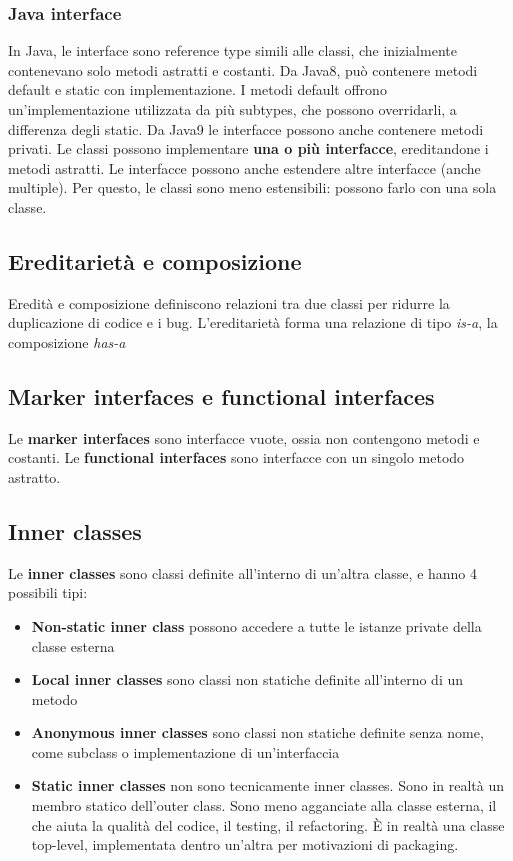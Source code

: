 \documentclass[11pt]{article}
\begin{document}
\subsubsection{Java interface}
In Java, le interface sono reference type simili alle classi, che inizialmente contenevano solo metodi astratti e costanti. Da Java8, può contenere metodi default e static con implementazione. I metodi default offrono un'implementazione utilizzata da più subtypes, che possono overridarli, a differenza degli static. Da Java9 le interfacce possono anche contenere metodi privati. Le classi possono implementare \textbf{una o più interfacce}, ereditandone i metodi astratti. Le interfacce possono anche estendere altre interfacce (anche multiple). Per questo, le classi sono meno estensibili: possono farlo con una sola classe.
\subsection{Ereditarietà e composizione}
Eredità e composizione definiscono relazioni tra due classi per ridurre la duplicazione di codice e i bug. L'ereditarietà forma una relazione di tipo \textit{is-a}, la composizione \textit{has-a}
\subsection{Marker interfaces e functional interfaces}
Le \textbf{marker interfaces} sono interfacce vuote, ossia non contengono metodi e costanti. Le \textbf{functional interfaces} sono interfacce con un singolo metodo astratto.
\subsection{Inner classes}
Le \textbf{inner classes} sono classi definite all'interno di un'altra classe, e hanno 4 possibili tipi:
\begin{itemize}
    \item \textbf{Non-static inner class} possono accedere a tutte le istanze private della classe esterna
    \item \textbf{Local inner classes} sono classi non statiche definite all'interno di un metodo
    \item \textbf{Anonymous inner classes} sono classi non statiche definite senza nome, come subclass o implementazione di un'interfaccia
    \item \textbf{Static inner classes} non sono tecnicamente inner classes. Sono in realtà un membro statico dell'outer class. Sono meno agganciate alla classe esterna, il che aiuta la qualità del codice, il testing, il refactoring. È in realtà una classe top-level, implementata dentro un'altra per motivazioni di packaging.
\end{itemize}
\end{document}
